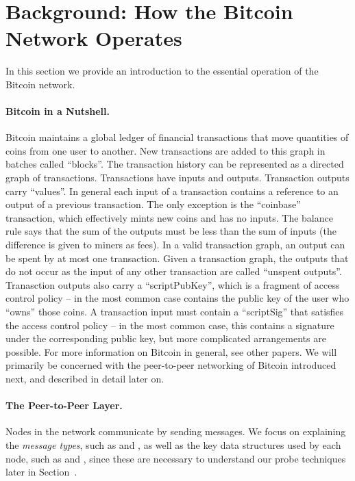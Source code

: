 \section{Background: How the Bitcoin Network Operates}
In this section we provide an introduction to the essential operation of the Bitcoin network.

\paragraph{Bitcoin in a Nutshell.}
Bitcoin maintains a global ledger of financial transactions that move quantities of coins from one user to another. New transactions are added to this graph in batches called ``blocks''. The transaction history can be represented as a directed graph of transactions.  Transactions have inputs and outputs. Transaction outputs carry ``values''. In general each input of a transaction contains a reference to an output of a previous transaction. The only exception is the ``coinbase'' transaction, which effectively mints new coins and has no inputs. The balance rule says that the sum of the outputs must be less than the sum of inputs (the difference is given to miners as fees). In a valid transaction graph, an output can be spent by at most one transaction. Given a transaction graph, the outputs that do not occur as the input of any other transaction are called ``unspent outputs''. Tranasction outputs also carry a ``scriptPubKey'', which is a fragment of access control policy -- in the most common case contains the public key of the user who ``owns'' those coins. A transaction input must contain a ``scriptSig'' that satisfies the access control policy -- in the most common case, this contains a signature under the corresponding public key, but more complicated arrangements are possible. For more information on Bitcoin in general, see other papers. We will primarily be concerned with the peer-to-peer networking of Bitcoin introduced next, and described in detail later on.

\paragraph{The Peer-to-Peer Layer.}
Nodes in the network communicate by sending messages.
We focus on explaining the \emph{message types}, such as  and , 
as well as the key data structures used by each node, such as  and , since these are necessary to understand our probe techniques later in Section~\cite{sec:techniques}.


